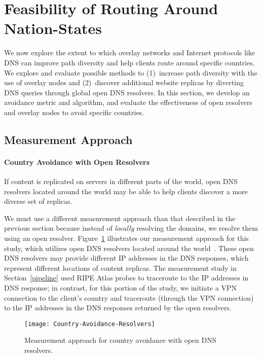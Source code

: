 \section{Feasibility of Routing Around Nation-States}
\label{avoid_results}

We now explore the extent to which overlay networks and Internet protocols like 
DNS can improve path diversity and help clients route around specific countries. We explore and evaluate possible
methods to (1)~increase path diversity with the use of overlay nodes and
(2)~discover additional website replicas by diverting DNS queries through
global open DNS resolvers.  In this section, we develop an avoidance metric and algorithm, and
evaluate the effectiveness of open resolvers and overlay nodes to avoid specific countries.

\subsection{Measurement Approach}
\label{avoid_pipelines}

\paragraph{Country Avoidance with Open Resolvers} If content is
replicated on servers in different parts of the world, open DNS
resolvers located 
around the world may be able to help clients discover a more diverse set of
replicas.  

We must use a different measurement approach than that described in the previous 
section because instead of {\it locally} resolving the domains, we resolve them 
using an open resolver.  Figure~\ref{fig:avoidance_resolvers} illustrates our measurement
approach for this study, which utilizes open DNS resolvers located around the
world~\cite{open_resolver_list}.  These open DNS resolvers may provide
different IP addresses in the DNS responses, which represent different
locations of content replicas. The measurement study in
Section~\ref{pipeline} used RIPE Atlas probes to traceroute to the IP
addresses in DNS response; in contrast, for this portion of the study, we
initiate a VPN connection to the client's country and traceroute
(through the VPN connection) to the IP addresses in the DNS responses
returned by the open resolvers.

\begin{figure}[t]
\centering
\texttt{[image: Country-Avoidance-Resolvers]}
\caption{Measurement approach for country avoidance with open DNS resolvers.}
\label{fig:avoidance_resolvers}
\end{figure}

